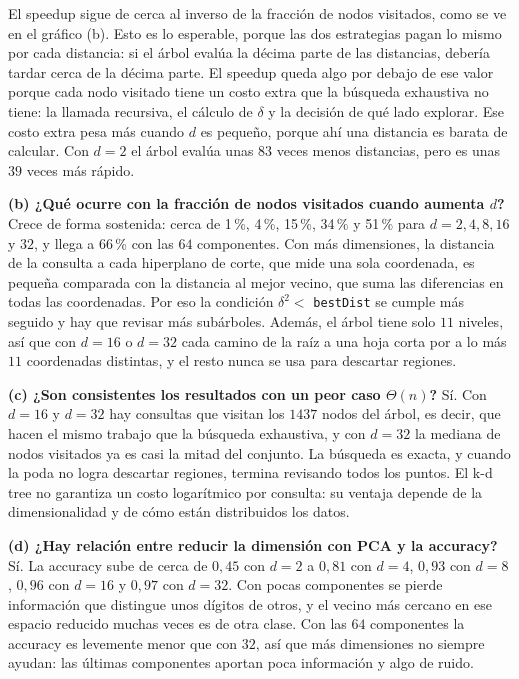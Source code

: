El speedup sigue de cerca al inverso de la fracción de nodos visitados, como se ve en el
gráfico (b). Esto es lo esperable, porque las dos estrategias pagan lo mismo por cada
distancia: si el árbol evalúa la décima parte de las distancias, debería tardar cerca de
la décima parte. El speedup queda algo por debajo de ese valor porque cada nodo visitado
tiene un costo extra que la búsqueda exhaustiva no tiene: la llamada recursiva, el cálculo
de $\delta$ y la decisión de qué lado explorar. Ese costo extra pesa más cuando $d$ es
pequeño, porque ahí una distancia es barata de calcular. Con $d = 2$ el árbol evalúa unas
$83$ veces menos distancias, pero es unas $39$ veces más rápido.

\textbf{(b) ¿Qué ocurre con la fracción de nodos visitados cuando aumenta $d$?} Crece de
forma sostenida: cerca de 1\,\%, 4\,\%, 15\,\%, 34\,\% y 51\,\% para
$d = 2, 4, 8, 16$ y $32$, y llega a 66\,\% con las $64$ componentes. Con más dimensiones,
la distancia de la consulta a cada hiperplano de corte, que mide una sola coordenada, es
pequeña comparada con la distancia al mejor vecino, que suma las diferencias en todas las
coordenadas. Por eso la condición $\delta^2 <$ \texttt{bestDist} se cumple más seguido y
hay que revisar más subárboles. Además, el árbol tiene solo $11$ niveles, así que con
$d = 16$ o $d = 32$ cada camino de la raíz a una hoja corta por a lo más $11$ coordenadas
distintas, y el resto nunca se usa para descartar regiones.

\textbf{(c) ¿Son consistentes los resultados con un peor caso $\Theta(n)$?} Sí. Con
$d = 16$ y $d = 32$ hay consultas que visitan los $1437$ nodos del árbol, es decir, que
hacen el mismo trabajo que la búsqueda exhaustiva, y con $d = 32$ la mediana de nodos
visitados ya es casi la mitad del conjunto. La búsqueda es exacta, y cuando la poda no
logra descartar regiones, termina revisando todos los puntos. El k-d tree no garantiza un
costo logarítmico por consulta: su ventaja depende de la dimensionalidad y de cómo están
distribuidos los datos.

\textbf{(d) ¿Hay relación entre reducir la dimensión con PCA y la accuracy?} Sí. La
accuracy sube de cerca de $0{,}45$ con $d = 2$ a $0{,}81$ con $d = 4$, $0{,}93$ con
$d = 8$, $0{,}96$ con $d = 16$ y $0{,}97$ con $d = 32$. Con pocas componentes se pierde
información que distingue unos dígitos de otros, y el vecino más cercano en ese espacio
reducido muchas veces es de otra clase. Con las $64$ componentes la accuracy es levemente
menor que con $32$, así que más dimensiones no siempre ayudan: las últimas componentes
aportan poca información y algo de ruido.


